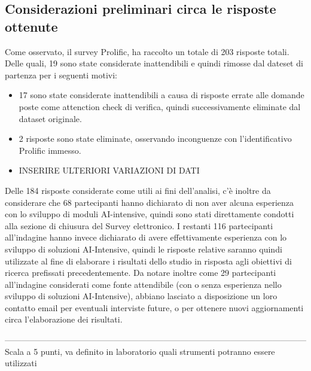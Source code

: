     \subsection{Considerazioni preliminari circa le risposte ottenute}
    Come osservato, il survey Prolific, ha raccolto un totale di 203 risposte totali. Delle quali, 19 sono state considerate inattendibili e quindi rimosse dal dateset di partenza per i seguenti motivi:
    
    \begin{itemize}
        \item 17 sono state considerate inattendibili a causa di risposte errate alle domande poste come attenction check di verifica, quindi successivamente eliminate dal dataset originale.
        \item 2 risposte sono state eliminate, osservando inconguenze con l'identificativo Prolific immesso.
        \item INSERIRE ULTERIORI VARIAZIONI DI DATI
    \end{itemize}
     
    Delle 184 risposte considerate come utili ai fini dell'analisi, c'è inoltre da considerare che 68 partecipanti hanno dichiarato di non aver alcuna esperienza con lo sviluppo di moduli AI-intensive, quindi sono stati direttamente condotti alla sezione di chiusura del Survey elettronico. I restanti 116 partecipanti all'indagine hanno invece dichiarato di avere effettivamente esperienza con lo sviluppo di soluzioni AI-Intensive, quindi le risposte relative saranno quindi utilizzate al fine di elaborare i risultati dello studio in risposta agli obiettivi di ricerca prefissati precedentemente.  Da notare inoltre come 29 partecipanti all'indagine considerati come fonte attendibile (con o senza esperienza nello sviluppo di soluzioni AI-Intensive), abbiano lasciato a disposizione un loro contatto email per eventuali interviste future, o per ottenere nuovi aggiornamenti circa l'elaborazione dei risultati.  
    
    ------------------------------------------------------------------------------------------------------------
    Scala a 5 punti, va definito in laboratorio quali strumenti potranno essere utilizzati 
    
